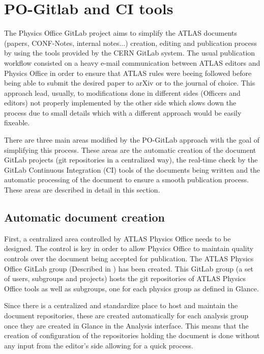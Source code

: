\section{PO-Gitlab and CI tools}
\label{sec:po-ci-tools}

The Physics Office GitLab project aims to simplify the ATLAS documents (papers, CONF-Notes, internal notes...) creation, editing and publication process by using the tools provided by the CERN GitLab system. The usual publication workflow consisted on a heavy e-mail communication between ATLAS editors and Physics Office in order to ensure that ATLAS rules were beeing followed before being able to submit the desired paper to arXiv or to the journal of choice. This approach lead, usually, to modifications done in different sides (Officers and editors) not properly implemented by the other side which slows down the process due to small details which with a different approach would be easily fixeable.

There are three main areas modified by the PO-GitLab approach with the goal of simplifying this process. These areas are the automatic creation of the document GitLab projects (git repositories in a centralized way), the real-time check by the GitLab Continuous Integration (CI) tools of the documents being written and the automatic processing of the document to ensure a smooth publication process. These areas are described in detail in this section.

\subsection{Automatic document creation}
First, a centralized area controlled by ATLAS Physics Office needs to be designed. The control is key in order to allow Physics Office to maintain quality controls over the document being accepted for publication. The ATLAS Physics Office GitLab group (Described in \Sect{\ref{sec:pogitlab-group}}) has been created. This GitLab group (a set of users, subgroups and projects) hosts the git repositories of ATLAS Physics Office tools as well as subgroups, one for each physics group as defined in Glance.

Since there is a centralized and standardize place to host and maintain the document repositories, these are created automatically for each analysis group once they are created in Glance in the Analysis interface. This means that the creation of configuration of the repositories holding the document is done without any input from the editor's side allowing for a quick process.


